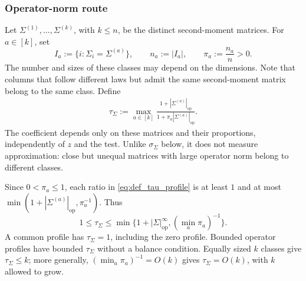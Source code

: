 \documentclass[EJP, preprint, NODS, nobera, nofontexpansion]{ejpecp}
\DeclareMathOperator{\op}{op}
\begin{document}
\subsubsection{Operator-norm route}
\label{sssec:main_operator_route}
Let $\Sigma^{(1)},\ldots,\Sigma^{(k)}$, with $k\leq n$, be the distinct
second-moment matrices. For $a\in[k]$, set
\[
 I_a:=\{i:\Sigma_i=\Sigma^{(a)}\},\qquad
 n_a:=|I_a|,\qquad \pi_a:=\frac{n_a}{n}>0.
\]
The number and sizes of these classes may depend on the dimensions. Note that columns that follow different laws but admit the same second-moment matrix belong to the same class. 
Define
\begin{align}\label{eq:def_tau_profile}
 \tau_\Sigma:=\max_{a\in[k]}
 \frac{1+|\Sigma^{(a)}|_{\op}}{1+\pi_a|\Sigma^{(a)}|_{\op}}.
\end{align} 
The coefficient depends
only on these matrices and their proportions, independently of $z$ and the
test. Unlike $\sigma_\Sigma$ below, it does not measure approximation:
close but unequal matrices with large operator norm belong to different classes.

\begin{remark}
\label{rem:tau_profile_specializations}
Since $0<\pi_a\leq1$, each ratio in \eqref{eq:def_tau_profile}
is at least \(1\) and at most $\min (1+|\Sigma^{(a)}|_{\op},\pi_a^{-1})$. Thus
\[
 1\leq\tau_\Sigma\leq
 \min\{1+|\Sigma|_{\op}^\infty,(\min_a\pi_a)^{-1}\}.
\]
A common profile has $\tau_\Sigma=1$, including the zero profile.
Bounded operator profiles have bounded $\tau_\Sigma$ without a balance
condition. Equally sized $k$ classes give $\tau_\Sigma\leq k$; more
generally, $(\min_a\pi_a)^{-1}=O(k)$ gives $\tau_\Sigma=O(k)$, with
$k$ allowed to grow. 
\end{remark}
\end{document}
